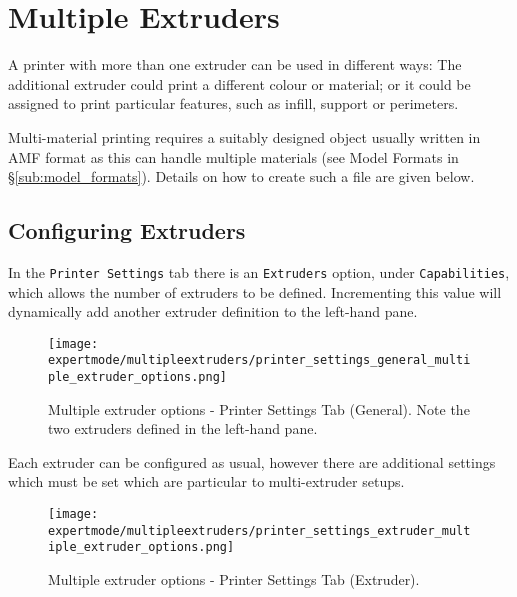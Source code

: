 
\section{Multiple Extruders} %
\label{sec:multiple_extruders}

A printer with more than one extruder can be used in different ways: The additional extruder could print a different colour or material; or it could be assigned to print particular features, such as infill, support or perimeters.  

Multi-material printing requires a suitably designed object usually written in AMF format as this can handle multiple materials (see Model Formats in §\ref{sub:model_formats}).  Details on how to create such a file are given below.


\subsection{Configuring Extruders} %
\label{sub:configuring_extruders}

In the \texttt{Printer Settings} tab there is an \texttt{Extruders} option, under \texttt{Capabilities}, which allows the number of extruders to be defined.  Incrementing this value will dynamically add another extruder definition to the left-hand pane.

\begin{figure}[H]
\centering
\texttt{[image: expertmode/multipleextruders/printer\_settings\_general\_multiple\_extruder\_options.png]}
\caption{Multiple extruder options - Printer Settings Tab (General).  Note the two extruders defined in the left-hand pane.}
\label{fig:printer_settings_general_multiple_extruder_options}
\end{figure}

Each extruder can be configured as usual, however there are additional settings which must be set which are particular to multi-extruder setups.  

\begin{figure}[H]
\centering
\texttt{[image: expertmode/multipleextruders/printer\_settings\_extruder\_multiple\_extruder\_options.png]}
\caption{Multiple extruder options - Printer Settings Tab (Extruder).}
\label{fig:printer_settings_extruder_multiple_extruder_options}
\end{figure}

